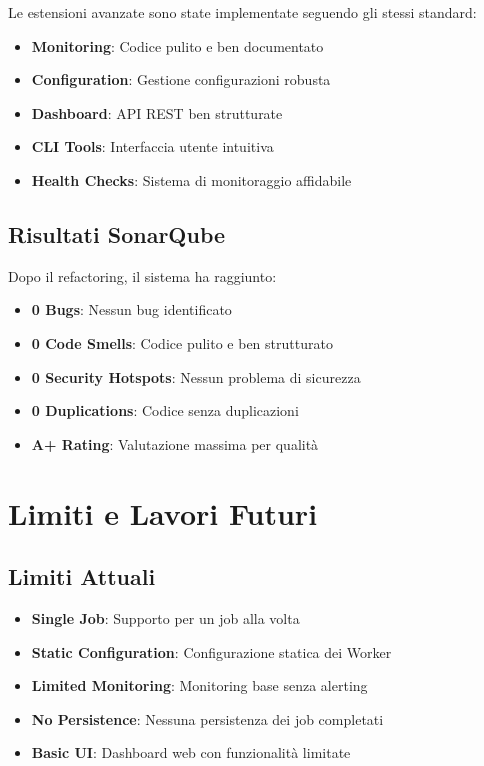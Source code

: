 \documentclass[12pt,a4paper]{article}
\begin{document}
Le estensioni avanzate sono state implementate seguendo gli stessi standard:

\begin{itemize}
\item \textbf{Monitoring}: Codice pulito e ben documentato
\item \textbf{Configuration}: Gestione configurazioni robusta
\item \textbf{Dashboard}: API REST ben strutturate
\item \textbf{CLI Tools}: Interfaccia utente intuitiva
\item \textbf{Health Checks}: Sistema di monitoraggio affidabile
\end{itemize}

\subsection{Risultati SonarQube}

Dopo il refactoring, il sistema ha raggiunto:

\begin{itemize}
\item \textbf{0 Bugs}: Nessun bug identificato
\item \textbf{0 Code Smells}: Codice pulito e ben strutturato
\item \textbf{0 Security Hotspots}: Nessun problema di sicurezza
\item \textbf{0 Duplications}: Codice senza duplicazioni
\item \textbf{A+ Rating}: Valutazione massima per qualità
\end{itemize}

\section{Limiti e Lavori Futuri}

\subsection{Limiti Attuali}

\begin{itemize}
\item \textbf{Single Job}: Supporto per un job alla volta
\item \textbf{Static Configuration}: Configurazione statica dei Worker
\item \textbf{Limited Monitoring}: Monitoring base senza alerting
\item \textbf{No Persistence}: Nessuna persistenza dei job completati
\item \textbf{Basic UI}: Dashboard web con funzionalità limitate
\end{itemize}
\end{document}
